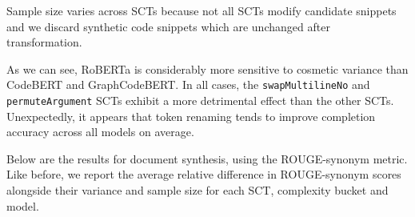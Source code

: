 \documentclass[sigconf,review,anonymous]{acmart}
\begin{document}
  Sample size varies across SCTs because not all SCTs modify candidate snippets and we discard synthetic code snippets which are unchanged after transformation.

  As we can see, RoBERTa is considerably more sensitive to cosmetic variance than CodeBERT and GraphCodeBERT. In all cases, the  \lstinline|swapMultilineNo| and \lstinline|permuteArgument| SCTs exhibit a more detrimental effect than the other SCTs. Unexpectedly, it appears that token renaming tends to improve completion accuracy across all models on average.

  Below are the results for document synthesis, using the ROUGE-synonym metric. Like before, we report the average relative difference in ROUGE-synonym scores alongside their variance and sample size for each SCT, complexity bucket and model.
\end{document}
